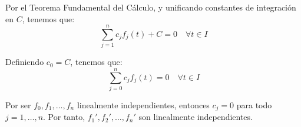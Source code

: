 \begin{ejercicio}
\begin{enumerate}
        Por el Teorema Fundamental del Cálculo, y unificando constantes de integración en $C$, tenemos que:
        \begin{equation*}
            \sum_{j=1}^n c_jf_j(t)+C=0 \quad \forall t\in I
        \end{equation*}

        Definiendo $c_0=C$, tenemos que:
        \begin{equation*}
            \sum_{j=0}^n c_jf_j(t)=0 \quad \forall t\in I
        \end{equation*}

        Por ser $f_0,f_1,\dots,f_n$ linealmente independientes, entonces $c_j=0$ para todo $j=1,\dots,n$. Por tanto, $f_1',f_2',\dots,f_n'$ son linealmente independientes.
    \end{enumerate}
\end{ejercicio}


